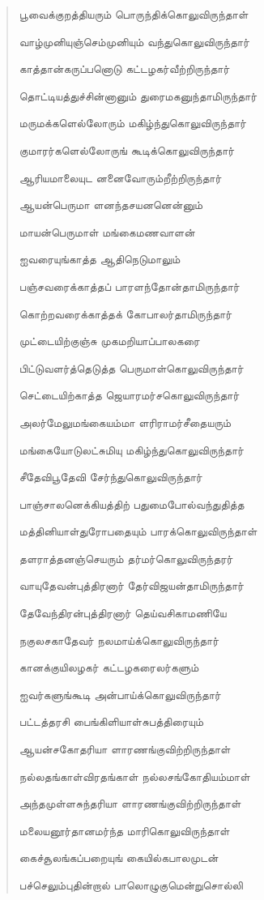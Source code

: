 \documentclass{article}
\begin{document}
\begin{quotation}
{பூவைக்குறத்தியரும் பொருந்திக்கொலுவிருந்தாள்

வாழ்முனியுஞ்செம்முனியும் வந்துகொலுவிருந்தார்

காத்தான்கருப்பனொடு கட்டழகர்வீற்றிருந்தார்

தொட்டியத்துச்சின்னானும் துரைமகனுந்தாமிருந்தார்

மருமக்களெல்லோரும் மகிழ்ந்துகொலுவிருந்தார்

குமாரர்களெல்லோருங் கூடிக்கொலுவிருந்தார்

ஆரியமாலையுட னனைவோரும்றீற்றிருந்தார்

ஆயன்பெருமா ளனந்தசயனனென்னும்

மாயன்பெருமாள் மங்கைமணவாளன்

ஐவரையுங்காத்த ஆதிநெடுமாலும்

பஞ்சவரைக்காத்தப் பாரளந்தோன்தாமிருந்தார்

கொற்றவரைக்காத்தக் கோபாலர்தாமிருந்தார்

முட்டையிற்குஞ்சு முகமறியாப்பாலகரை

பிட்டுவளர்த்தெடுத்த பெருமாள்கொலுவிருந்தார்

செட்டையிற்காத்த ஜெயாரமர்சகொலுவிருந்தார்

அலர்மேலுமங்கையம்மா ளரிராமர்சீதையரும்

மங்கையோடுலட்சுமியு மகிழ்ந்துகொலுவிருந்தார்

சீதேவிபூதேவி சேர்ந்துகொலுவிருந்தார்

பாஞ்சாலனெக்கியத்திற் பதுமைபோல்வந்துதித்த

மத்தினியாள்துரோபதையும் பாரக்கொலுவிருந்தாள்

தளராத்தனஞ்செயரும் தர்மர்கொலுவிருந்தரர்

வாயுதேவன்புத்திரனார்‌ தேர்விஜயன்தாமிருந்தார்‌

தேவேந்திரன்புத்திரனார் தெய்வசிகாமணியே

நகுலசகாதேவர் நலமாய்க்கொலுவிருந்தார்

கானக்குயிலழகர் கட்டழகரைலர்களும்

ஐவர்களுங்கூடி அன்பாய்க்கொலுவிருந்தார்

பட்டத்தரசி பைங்கிளியாள்சுபத்திரையும்

ஆயன்சகோதரியா ளாரணங்குவிற்றிருந்தாள்

நல்லதங்காள்விரதங்காள் நல்லசங்கோதியம்மாள்

அந்தமுள்ளசுந்தரியா ளாரணங்குவிற்றிருந்தாள்

மலையனூர்தானமர்ந்த மாரிகொலுவிருந்தாள்

கைச்சூலங்கப்பறையுங் கையில்கபாலமுடன்

பச்செலும்புதின்றால் பாலொழுகுமென்றுசொல்லி

}
\end{quotation}
\end{document}
